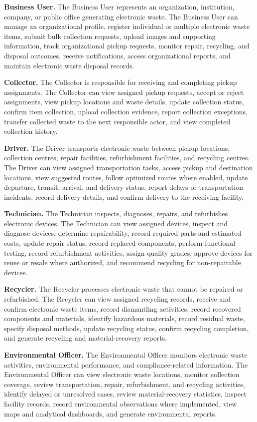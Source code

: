 \textbf{Business User.} The Business User represents an organization,
institution, company, or public office generating electronic waste. The
Business User can manage an organizational profile, register individual or
multiple electronic waste items, submit bulk collection requests, upload
images and supporting information, track organizational pickup requests,
monitor repair, recycling, and disposal outcomes, receive notifications, access
organizational reports, and maintain electronic waste disposal records.

\textbf{Collector.} The Collector is responsible for receiving and completing
pickup assignments. The Collector can view assigned pickup requests, accept
or reject assignments, view pickup locations and waste details, update
collection status, confirm item collection, upload collection evidence, report
collection exceptions, transfer collected waste to the next responsible actor,
and view completed collection history.

\textbf{Driver.} The Driver transports electronic waste between pickup
locations, collection centres, repair facilities, refurbishment facilities, and
recycling centres. The Driver can view assigned transportation tasks, access
pickup and destination locations, view suggested routes, follow optimized
routes where enabled, update departure, transit, arrival, and delivery status,
report delays or transportation incidents, record delivery details, and confirm
delivery to the receiving facility.

\textbf{Technician.} The Technician inspects, diagnoses, repairs, and
refurbishes electronic devices. The Technician can view assigned devices,
inspect and diagnose devices, determine repairability, record required parts
and estimated costs, update repair status, record replaced components,
perform functional testing, record refurbishment activities, assign quality
grades, approve devices for reuse or resale where authorized, and recommend
recycling for non-repairable devices.

\textbf{Recycler.} The Recycler processes electronic waste that cannot be
repaired or refurbished. The Recycler can view assigned recycling records,
receive and confirm electronic waste items, record dismantling activities,
record recovered components and materials, identify hazardous materials,
record residual waste, specify disposal methods, update recycling status,
confirm recycling completion, and generate recycling and material-recovery
reports.

\textbf{Environmental Officer.} The Environmental Officer monitors
electronic waste activities, environmental performance, and
compliance-related information. The Environmental Officer can view electronic
waste locations, monitor collection coverage, review transportation, repair,
refurbishment, and recycling activities, identify delayed or unresolved cases,
review material-recovery statistics, inspect facility records, record
environmental observations where implemented, view maps and analytical
dashboards, and generate environmental reports.

